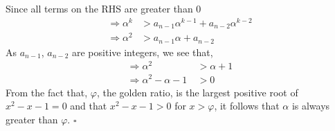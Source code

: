 \begin{multicols}{2}
Since all terms on the RHS are greater than 0
\begin{align}
\Rightarrow \alpha^{k} &>  a_{n-1}\alpha^{k-1} + a_{n-2}\alpha^{k-2}\nonumber \\
\Rightarrow \alpha^{2} &>  a_{n-1}\alpha + a_{n-2}\nonumber
\end{align}
As $a_{n-1}$, $a_{n-2}$ are positive integers, we see that,
\begin{align}
\Rightarrow \alpha^{2} &>  \alpha + 1\nonumber\\
\label{alphaphicompare}\Rightarrow \alpha^{2} -  \alpha - 1\ &> 0
\end{align}
From the fact that, $\varphi$, the golden ratio, is the largest positive root of $x^2-x-1 = 0$ and that $x^2-x-1 > 0$ for $x > \varphi$, it follows that
$\alpha$ is always greater than $\varphi$.
\hfill{$\square$}


\end{multicols}
